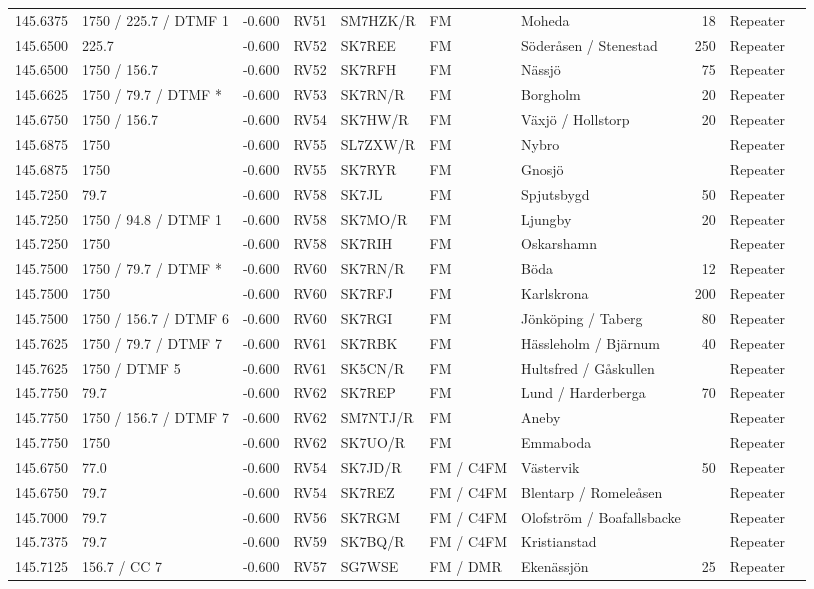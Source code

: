 \begin{longtable}{lllllllrlr}
145.6375&1750 / 225.7 / DTMF 1&-0.600&RV51&SM7HZK/R&FM&Moheda&18&Repeater&\\
145.6500&225.7&-0.600&RV52&SK7REE&FM&Söderåsen / Stenestad&250&Repeater&\\
145.6500&1750 / 156.7&-0.600&RV52&SK7RFH&FM&Nässjö&75&Repeater&\\
145.6625&1750 / 79.7 / DTMF *&-0.600&RV53&SK7RN/R&FM&Borgholm&20&Repeater&\\
145.6750&1750 / 156.7&-0.600&RV54&SK7HW/R&FM&Växjö / Hollstorp&20&Repeater&\\
145.6875&1750&-0.600&RV55&SL7ZXW/R&FM&Nybro&&Repeater&\\
145.6875&1750&-0.600&RV55&SK7RYR&FM&Gnosjö&&Repeater&\\
145.7250&79.7&-0.600&RV58&SK7JL&FM&Spjutsbygd&50&Repeater&\\
145.7250&1750 / 94.8 / DTMF 1&-0.600&RV58&SK7MO/R&FM&Ljungby&20&Repeater&\\
145.7250&1750&-0.600&RV58&SK7RIH&FM&Oskarshamn&&Repeater&\\
145.7500&1750 / 79.7 / DTMF *&-0.600&RV60&SK7RN/R&FM&Böda&12&Repeater&\\
145.7500&1750&-0.600&RV60&SK7RFJ&FM&Karlskrona&200&Repeater&\\
145.7500&1750 / 156.7 / DTMF 6&-0.600&RV60&SK7RGI&FM&Jönköping / Taberg&80&Repeater&\\
145.7625&1750 / 79.7 / DTMF 7&-0.600&RV61&SK7RBK&FM&Hässleholm / Bjärnum&40&Repeater&\\
145.7625&1750 / DTMF 5&-0.600&RV61&SK5CN/R&FM&Hultsfred / Gåskullen&&Repeater&\\
145.7750&79.7&-0.600&RV62&SK7REP&FM&Lund / Harderberga&70&Repeater&\\
145.7750&1750 / 156.7 / DTMF 7&-0.600&RV62&SM7NTJ/R&FM&Aneby&&Repeater&\\
145.7750&1750&-0.600&RV62&SK7UO/R&FM&Emmaboda&&Repeater&\\
145.6750&77.0&-0.600&RV54&SK7JD/R&FM / C4FM&Västervik&50&Repeater&\\
145.6750&79.7&-0.600&RV54&SK7REZ&FM / C4FM&Blentarp / Romeleåsen&&Repeater&\\
145.7000&79.7&-0.600&RV56&SK7RGM&FM / C4FM&Olofström / Boafallsbacke&&Repeater&\\
145.7375&79.7&-0.600&RV59&SK7BQ/R&FM / C4FM&Kristianstad&&Repeater&\\
145.7125&156.7 / CC 7&-0.600&RV57&SG7WSE&FM / DMR&Ekenässjön&25&Repeater&\\
\end{longtable}
